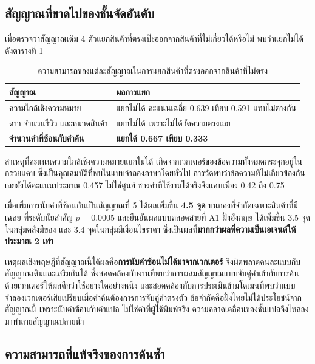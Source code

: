 \subsection{สัญญาณที่ขาดไปของชั้นจัดอันดับ}

เมื่อตรวจว่าสัญญาณเดิม 4 ตัวแยกสินค้าที่ตรงเป๊ะออกจากสินค้าที่ไม่เกี่ยวได้หรือไม่ พบว่าแยกไม่ได้ ดังตารางที่ \ref{tab:signal_power}

\begin{table}[H]
\centering
\caption{ความสามารถของแต่ละสัญญาณในการแยกสินค้าที่ตรงออกจากสินค้าที่ไม่ตรง}
\label{tab:signal_power}
\begin{tabular}{|l|p{7.6cm}|}
\hline
\textbf{สัญญาณ} & \textbf{ผลการแยก} \\
\hline
ความใกล้เชิงความหมาย & แยกไม่ได้ คะแนนเฉลี่ย 0.639 เทียบ 0.591 แทบไม่ต่างกัน \\ \hline
ดาว จำนวนรีวิว และหมวดสินค้า & แยกไม่ได้ เพราะไม่ได้วัดความตรงเลย \\ \hline
\textbf{จำนวนคำที่ซ้อนกับคำค้น} & \textbf{แยกได้ 0.667 เทียบ 0.333} \\
\hline
\end{tabular}
\end{table}

สาเหตุที่คะแนนความใกล้เชิงความหมายแยกไม่ได้ เกิดจากเวกเตอร์ของข้อความทั้งหมดกระจุกอยู่ในกรวยแคบ ซึ่งเป็นคุณสมบัติที่พบในแบบจำลองภาษาโดยทั่วไป \cite{ethayarajh2019contextual} การวัดพบว่าข้อความที่ไม่เกี่ยวข้องกันเลยยังได้คะแนนประมาณ 0.457 ไม่ใช่ศูนย์ ช่วงค่าที่ใช้งานได้จริงจึงแคบเพียง 0.42 ถึง 0.75

เมื่อเพิ่มการนับคำที่ซ้อนกันเป็นสัญญาณที่ 5 ได้ผลเพิ่มขึ้น \textbf{4.5 จุด} บนกองที่จำกัดเฉพาะสินค้าที่มีเฉลย ที่ระดับนัยสำคัญ $p = 0.0005$ และยืนยันผลแบบตลอดสายที่ A1 ฝั่งอังกฤษ ได้เพิ่มขึ้น 3.5 จุดในกลุ่มคลังมีของ และ 3.4 จุดในกลุ่มมีเงื่อนไขราคา ซึ่งเป็นผลที่\textbf{มากกว่าผลที่ความเป็นเอเจนต์ให้ประมาณ 2 เท่า}



เหตุผลเชิงทฤษฎีที่สัญญาณนี้ได้ผลคือ\textbf{การนับคำซ้อนไม่ได้มาจากเวกเตอร์} จึงผิดพลาดคนละแบบกับสัญญาณเดิมและเสริมกันได้ ซึ่งสอดคล้องกับงานที่พบว่าการผสมสัญญาณแบบจับคู่คำเข้ากับการค้นด้วยเวกเตอร์ให้ผลดีกว่าใช้อย่างใดอย่างหนึ่ง \cite{karpukhin2020dpr, luan2021sparse} และสอดคล้องกับการประเมินข้ามโดเมนที่พบว่าแบบจำลองเวกเตอร์เสียเปรียบเมื่อคำค้นต้องการการจับคู่คำตรงตัว \cite{thakur2021beir} ข้อจำกัดคือฝั่งไทยไม่ได้ประโยชน์จากสัญญาณนี้ เพราะนับคำซ้อนกับคำแปล ไม่ใช่คำที่ผู้ใช้พิมพ์จริง ความคลาดเคลื่อนของชั้นแปลจึงไหลลงมาทำลายสัญญาณปลายน้ำ

\subsection{ความสามารถที่แท้จริงของการค้นซ้ำ}

